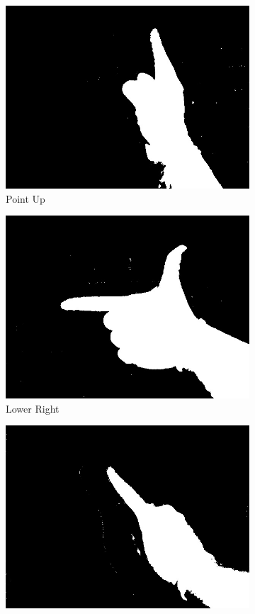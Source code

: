\begin{figure}
\centering
\begin{subfigure}[b]{0.25\columnwidth}
\centering
\includegraphics[width=0.95\columnwidth]{ch5/figs/pointing_up.png}
\caption{Point Up}
\end{subfigure}%
\begin{subfigure}[b]{0.25\columnwidth}
\centering
\includegraphics[width=0.95\columnwidth]{ch5/figs/lower_right_corner.png}
\caption{Lower Right}
\end{subfigure}%
\begin{subfigure}[b]{0.25\columnwidth}
\centering
\includegraphics[width=0.95\columnwidth]{ch5/figs/point_angled.png}

\end{subfigure}
\end{figure}
